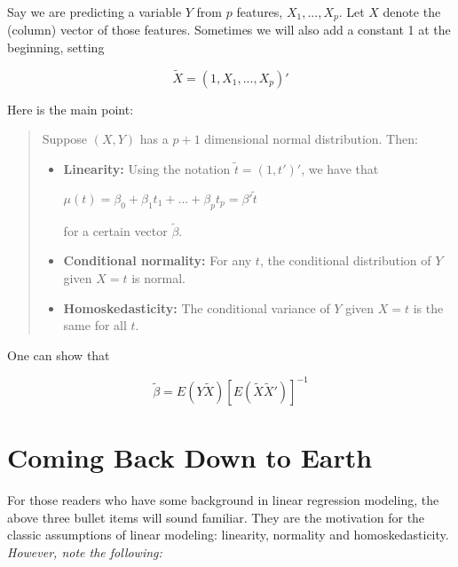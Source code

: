Say we are predicting a variable $Y$ from $p$ features, $X_1,...,X_p$.
Let $X$ denote the (column) vector of those features.  Sometimes we will
also add a constant 1 at the beginning, setting

\begin{equation}
\widetilde{X} = (1,X_1,...,X_p)' 
\end{equation}

Here is the main point:

\begin{quote}
Suppose $(X,Y)$ has a $p+1$ dimensional normal distribution.  Then:

\begin{itemize}

\item \textbf{Linearity:} Using the notation $\widetilde{t} = (1,t')'$,
we have that 

$\mu(t) = \beta_0 + \beta_1 t_1 + ... + \beta_p t_p  = \beta' \widetilde{t}$

for a certain vector $\widetilde{\beta}$.

\item \textbf{Conditional normality:}  For any $t$, the conditional
distribution of $Y$ given $X = t$ is normal.

\item \textbf{Homoskedasticity:}  The conditional
variance of $Y$ given $X = t$ is the same for all $t$.

\end{itemize} 

\end{quote}

One can show that

\begin{equation}
\widetilde{\beta} = E(Y \widetilde{X}) [ E( \widetilde{X} \widetilde{X}') ]^{-1}
\end{equation}

\section{Coming Back Down to Earth}

For those readers who have some background in linear regression modeling, 
the above three bullet items will sound familiar.  They are the
motivation for the classic assumptions of linear modeling:  linearity,
normality and homoskedasticity.  \textit{However, note the following:}

